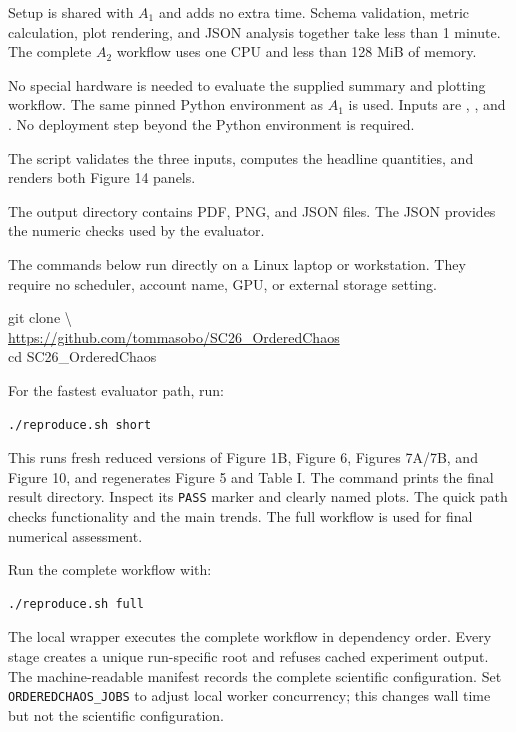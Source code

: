 \documentclass[conference]{IEEEtran}
\begin{document}
\arttime
Setup is shared with $A_1$ and adds no extra time. Schema validation, metric
calculation, plot rendering, and JSON analysis together take less than
1 minute. The complete $A_2$ workflow uses one CPU and less than 128 MiB of
memory.

\artin
{}
No special hardware is needed to evaluate the supplied summary and plotting
workflow.
The same pinned Python environment as $A_1$ is used.
Inputs are ,
, and
.
No deployment step beyond the Python environment is required.

\artcomp
The script validates the three inputs, computes the headline quantities, and
renders both Figure 14 panels.

\artout
The output directory contains PDF, PNG, and JSON files. The JSON provides the
numeric checks used by the evaluator.

\appendixAE
{}
\artin
The commands below run directly on a Linux laptop or workstation. They require
no scheduler, account name, GPU, or external storage setting.

\begin{flushleft}
\ttfamily
git clone \textbackslash\\
\url{https://github.com/tommasobo/SC26_OrderedChaos}\\
cd SC26\_OrderedChaos
\end{flushleft}

\artcomp
For the fastest evaluator path, run:

\begin{verbatim}
./reproduce.sh short
\end{verbatim}

This runs fresh reduced versions of Figure 1B, Figure 6, Figures 7A/7B, and
Figure 10, and regenerates Figure 5 and Table I. The command prints the final
result directory. Inspect its \texttt{PASS} marker and clearly named plots.
The quick path checks functionality and the main trends. The full workflow is
used for final numerical assessment.

Run the complete workflow with:

\begin{verbatim}
./reproduce.sh full
\end{verbatim}

The local wrapper executes the complete workflow in dependency order. Every
stage creates a unique run-specific root and refuses cached experiment output.
The machine-readable manifest records the complete scientific configuration.
Set \texttt{ORDEREDCHAOS\_JOBS} to adjust local worker concurrency; this
changes wall time but not the scientific configuration.
\end{document}
